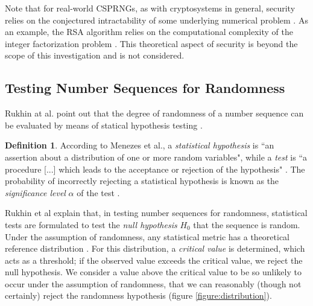 \documentclass[12pt, titlepage]{report}
\theoremstyle{definition}
\newtheorem{definition}{Definition}
\begin{document}
Note that for real-world CSPRNGs, as with cryptosystems in general, security relies on the conjectured intractability of some underlying numerical problem \cite[p. 185]{menezes1996handbook}. As an example, the RSA algorithm relies on the computational complexity of the integer factorization problem \cite[p. 170-173]{anderson2010security}. This theoretical aspect of security is beyond the scope of this investigation and is not considered.



\subsection{Testing Number Sequences for Randomness}\label{subsection:testing_prngs}
Rukhin at al. point out that the degree of randomness of a number sequence can be evaluated by means of statical hypothesis testing \cite[s. 1-3]{rukhin2001statistical}.

\begin{definition}
According to Menezes et al., a \emph{statistical hypothesis} is ``an assertion about a distribution of one or more random variables", while a \emph{test} is ``a procedure [...] which leads to the acceptance or rejection of the hypothesis" \cite[p. 179]{menezes1996handbook}. The probability of incorrectly rejecting a statistical hypothesis is known as the \emph{significance level} $\alpha$ of the test \cite[p. 179]{menezes1996handbook}.
\end{definition}

Rukhin et al explain that, in testing number sequences for randomness, statistical tests are formulated to test the \emph{null hypothesis} $H_0$ that the sequence is random. Under the assumption of randomness, any statistical metric has a theoretical reference distribution \cite[p. 1.3]{rukhin2001statistical}. For this distribution, a \emph{critical value} is determined, which acts as a threshold; if the observed value exceeds the critical value, we reject the null hypothesis. We consider a value above the critical value to be so unlikely to occur under the assumption of randomness, that we can reasonably (though not certainly) reject the randomness hypothesis \cite[p. 1.3]{rukhin2001statistical} (figure \ref{figure:distribution}).
\end{document}

